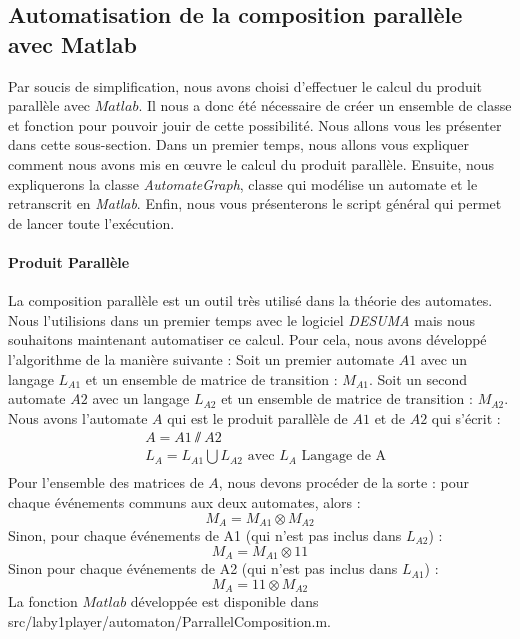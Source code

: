 \subsection{Automatisation de la composition parallèle avec Matlab}
\label{subsec:parallele}
Par soucis de simplification, nous avons choisi d'effectuer le calcul du produit parallèle avec $Matlab$. Il nous a donc été nécessaire de créer un ensemble de classe et fonction pour pouvoir jouir de cette possibilité. Nous allons vous les présenter dans cette sous-section. Dans un premier temps, nous allons vous expliquer comment nous avons mis en œuvre le calcul du produit parallèle. Ensuite, nous expliquerons la classe \emph{AutomateGraph}, classe qui modélise un automate et le retranscrit en \emph{Matlab}. Enfin, nous vous présenterons le script général qui permet de lancer toute l'exécution. 

\paragraph*{Produit Parallèle}
La composition parallèle est un outil très utilisé dans la théorie des automates. Nous l'utilisions dans un premier temps avec le logiciel \emph{DESUMA} mais nous souhaitons maintenant automatiser ce calcul. Pour cela, nous avons développé l'algorithme de la manière suivante :
Soit un premier automate $ A1$  avec un langage $L_{A1}$  et un ensemble de matrice de transition : $M_{A1}$.
Soit un second automate $A2$  avec un langage $L_{A2}$  et un ensemble de matrice de transition : $M_{A2}$.\\
Nous avons l'automate $A$ qui est le produit parallèle de $A1$ et de $A2$  qui s'écrit :
\begin{align*}
& A = A1 \sslash A2\\
&L_A = L_{A1} \bigcup L_{A2} \text{ avec } L_A\text{ Langage de A}\\
\end{align*}
Pour l'ensemble des matrices de $A$, nous devons procéder de la sorte : pour chaque événements communs aux deux automates, alors :
\begin{equation}
M_{A} = M_{A1} \otimes M_{A2}
\end{equation}
Sinon, pour chaque événements de A1 (qui n'est pas inclus dans $L_{A2}$) :
\begin{equation}
M_{A} = M_{A1} \otimes 1\!\!1 
\end{equation}
Sinon pour chaque événements de A2 (qui n'est pas inclus dans $L_{A1}$) :
\begin{equation}
M_{A} = 1\!\!1 \otimes M_{A2}
\end{equation}
La fonction $Matlab$ développée est disponible dans src/laby1player/automaton/ParrallelComposition.m. 


